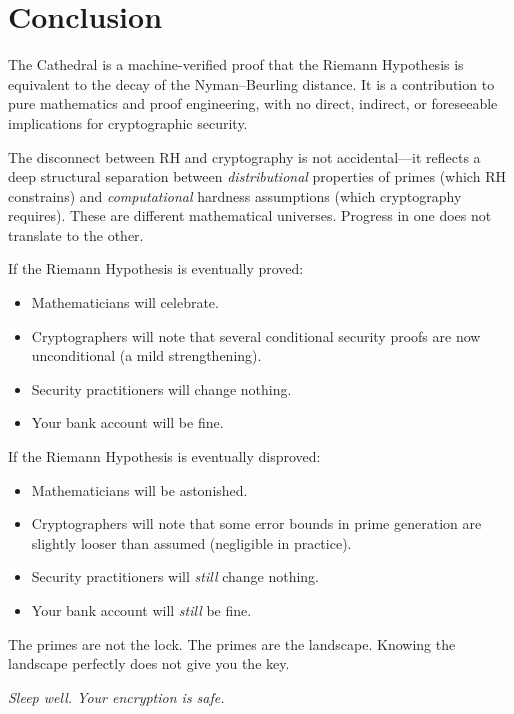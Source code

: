 \documentclass[11pt,a4paper]{article}
\theoremstyle{definition}
\theoremstyle{plain}
\begin{document}
\section{Conclusion}
\label{sec:conclusion}

The Cathedral is a machine-verified proof that the Riemann Hypothesis
is equivalent to the decay of the Nyman--Beurling distance. It is a
contribution to pure mathematics and proof engineering, with no
direct, indirect, or foreseeable implications for cryptographic
security.

The disconnect between RH and cryptography is not accidental---it
reflects a deep structural separation between \emph{distributional}
properties of primes (which RH constrains) and \emph{computational}
hardness assumptions (which cryptography requires). These are
different mathematical universes. Progress in one does not translate
to the other.

If the Riemann Hypothesis is eventually proved:
\begin{itemize}
  \item Mathematicians will celebrate.
  \item Cryptographers will note that several conditional security
    proofs are now unconditional (a mild strengthening).
  \item Security practitioners will change nothing.
  \item Your bank account will be fine.
\end{itemize}

If the Riemann Hypothesis is eventually disproved:
\begin{itemize}
  \item Mathematicians will be astonished.
  \item Cryptographers will note that some error bounds in prime
    generation are slightly looser than assumed (negligible in
    practice).
  \item Security practitioners will \emph{still} change nothing.
  \item Your bank account will \emph{still} be fine.
\end{itemize}

The primes are not the lock. The primes are the landscape.
Knowing the landscape perfectly does not give you the key.

\vspace{0.5cm}
\begin{flushright}
\emph{Sleep well. Your encryption is safe.}
\end{flushright}
\end{document}

